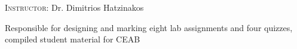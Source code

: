 \documentclass[12pt]{cv_style}
\begin{document}
\textsc{Instructor:} Dr. Dimitrios Hatzinakos\\
\begin{ditem}
	\item Responsible for designing and marking eight lab assignments and four quizzes, compiled student material for CEAB
\end{ditem}

%
\end{document}
